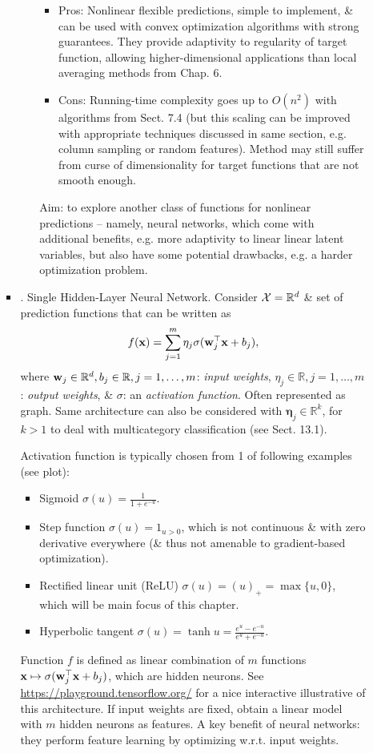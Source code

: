 \documentclass{article}
\begin{document}
\begin{enumerate}
\begin{itemize}
\begin{itemize}
\begin{itemize}
				\begin{itemize}
					\item Pros: Nonlinear flexible predictions, simple to implement, \& can be used with convex optimization algorithms with strong guarantees. They provide adaptivity to regularity of target function, allowing higher-dimensional applications than local averaging methods from Chap. 6.
					\item Cons: Running-time complexity goes up to $O(n^2)$ with algorithms from Sect. 7.4 (but this scaling can be improved with appropriate techniques discussed in same section, e.g. column sampling or random features). Method may still suffer from curse of dimensionality for target functions that are not smooth enough.
				\end{itemize}
				Aim: to explore another class of functions for nonlinear predictions -- namely, neural networks, which come with additional benefits, e.g. more adaptivity to linear linear latent variables, but also have some potential drawbacks, e.g. a harder optimization problem.
			\end{itemize}
			\item {. Single Hidden-Layer Neural Network.} Consider ${\cal X} = \mathbb{R}^d$ \& set of prediction functions that can be written as
			\begin{equation}
				f({\bf x}) = \sum_{j=1}^m \eta_j\sigma({\bf w}_j^\top{\bf x} + b_j),
			\end{equation}
			where ${\bf w}_j\in\mathbb{R}^d,b_j\in\mathbb{R},j = 1,\ldots,m$: {\it input weights}, $\eta_j\in\mathbb{R},j = 1,\ldots,m$: {\it output weights}, \& $\sigma$: an {\it activation function}. Often represented as {\sf graph}. Same architecture can also be considered with $\boldsymbol{\eta}_j\in\mathbb{R}^k$, for $k > 1$ to deal with multicategory classification (see Sect. 13.1).
			
			Activation function is typically chosen from 1 of following examples (see {\sf plot}):
			\begin{itemize}
				\item Sigmoid $\sigma(u) = \frac{1}{1 + e^{-u}}$.
				\item Step function $\sigma(u) = 1_{u > 0}$, which is not continuous \& with zero derivative everywhere (\& thus not amenable to gradient-based optimization).
				\item Rectified linear unit (ReLU) $\sigma(u) = (u)_+ = \max\{u,0\}$, which will be main focus of this chapter.
				\item Hyperbolic tangent $\sigma(u) = \tanh u = \frac{e^u - e^{-u}}{e^u + e^{-u}}$.
			\end{itemize}
			Function $f$ is defined as linear combination of $m$ functions ${\bf x}\mapsto\sigma({\bf w}_j^\top{\bf x} + b_j)$, which are hidden neurons. See \url{https://playground.tensorflow.org/} for a nice interactive illustrative of this architecture. If input weights are fixed, obtain a linear model with $m$ hidden neurons as features. A key benefit of neural networks: they perform feature learning by optimizing w.r.t. input weights.
			

\end{itemize}
\end{itemize}
\end{enumerate}
\end{document}
